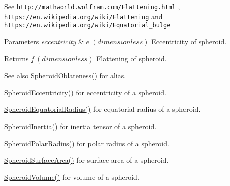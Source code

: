 See \href{http://mathworld.wolfram.com/Flattening.html}{\tt http\+://mathworld.\+wolfram.\+com/\+Flattening.\+html} , \href{https://en.wikipedia.org/wiki/Flattening}{\tt https\+://en.\+wikipedia.\+org/wiki/\+Flattening} and \href{https://en.wikipedia.org/wiki/Equatorial_bulge}{\tt https\+://en.\+wikipedia.\+org/wiki/\+Equatorial\+\_\+bulge} 
\begin{DoxyParams}{Parameters}
{\em eccentricity} & $ e\ (dimensionless)$ Eccentricity of spheroid. \\
\hline
\end{DoxyParams}
\begin{DoxyReturn}{Returns}
$ f\ (dimensionless)$ Flattening of spheroid. 
\end{DoxyReturn}
\begin{DoxySeeAlso}{See also}
\mbox{\hyperlink{group___e_g_x_math-_geometry-3_d-_spheroid-_flattening_ga486adfc58b047197daf87f50b2039ca7}{Spheroid\+Oblateness()}} for alias. 

\mbox{\hyperlink{group___e_g_x_math-_geometry-3_d-_spheroid-_eccentricity_gab45680528a41bb7a5e15ddc0059156dd}{Spheroid\+Eccentricity()}} for eccentricity of a spheroid. 

\mbox{\hyperlink{group___e_g_x_math-_geometry-3_d-_spheroid-_equatorial_radius_ga1cbe564fee1b509c622d1c6d276158cd}{Spheroid\+Equatorial\+Radius()}} for equatorial radius of a spheroid. 

\mbox{\hyperlink{group___e_g_x_math-_geometry-3_d-_spheroid-_inertia_ga4a6085f1b3504bd682ee6818542ae09e}{Spheroid\+Inertia()}} for inertia tensor of a spheroid. 

\mbox{\hyperlink{group___e_g_x_math-_geometry-3_d-_spheroid-_polar_radius_gad4791a46a7efe39c63c03d2366fdd3d2}{Spheroid\+Polar\+Radius()}} for polar radius of a spheroid. 

\mbox{\hyperlink{group___e_g_x_math-_geometry-3_d-_spheroid-_surface_area_ga5a3580e7ded82cb678a558905f41ae49}{Spheroid\+Surface\+Area()}} for surface area of a spheroid. 

\mbox{\hyperlink{group___e_g_x_math-_geometry-3_d-_spheroid-_volume_ga12125484235e94b8f2580f3476b05b92}{Spheroid\+Volume()}} for volume of a spheroid. 
\end{DoxySeeAlso}
\mbox{\label{group___e_g_x_math-_geometry-3_d-_spheroid-_flattening_ga9769747e144e2209b7927632b854c31f}} 
